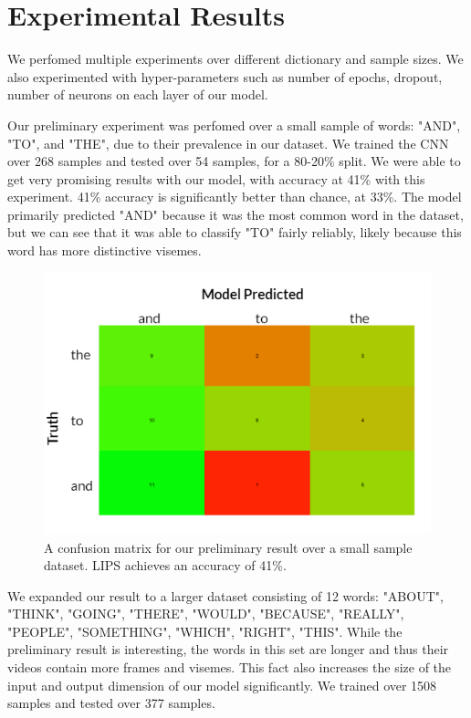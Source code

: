 \documentclass{article}
\begin{document}
\section{Experimental Results}

We perfomed multiple experiments over different dictionary and sample sizes. We also experimented with hyper-parameters such as number of epochs, dropout, number of neurons on each layer of our model.

Our preliminary experiment was perfomed over a small sample of words: "AND", "TO", and "THE", due to their prevalence in our dataset. We trained the CNN over 268 samples and tested over 54 samples, for a 80-20\% split. We were able to get very promising results with our model, with accuracy at 41\% with this experiment. 41\% accuracy is significantly better than chance, at 33\%. The model primarily predicted "AND" because it was the most common word in the dataset, but we can see that it was able to classify "TO" fairly reliably, likely because this word has more distinctive visemes.

   \begin{figure}[h!]
 \centering
  \includegraphics{result1}
 \caption{A confusion matrix for our preliminary result over a small sample dataset. LIPS achieves an accuracy of 41\%.}
 \end{figure}

We expanded our result to a larger dataset consisting of 12 words: "ABOUT", "THINK", "GOING", "THERE", "WOULD", "BECAUSE", "REALLY", "PEOPLE", "SOMETHING", "WHICH", "RIGHT", "THIS". While the preliminary result is interesting, the words in this set are longer and thus their videos contain more frames and visemes. This fact also increases the size of the input and output dimension of our model significantly. We trained over 1508 samples and tested over 377 samples.
\end{document}
